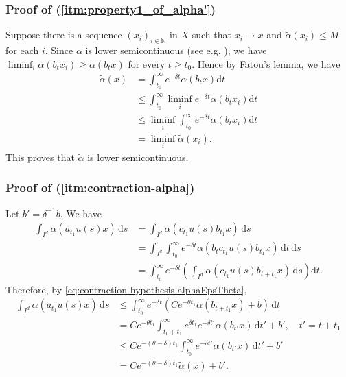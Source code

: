 \documentclass[12pt,reqno]{amsart}
\numberwithin{equation}{section}
\theoremstyle{plain}
\theoremstyle{definition}
\theoremstyle{remark}
\newcommand{\N}{\mathbb{N}}
\newcommand{\de}{\mathrm{d}}
\newcommand{\at}{\widetilde{\alpha}}
\begin{document}
	\subsubsection*{Proof of (\ref{itm:property1_of_alpha'})}
			Suppose there is a sequence $(x_i)_{i\in\N}$ in $X$ such that $x_i\to x$ and $\at (x_i)\leq M$ for each $i$. Since $\alpha$ is lower semicontinuous (see e.g. \cite[Lemma 4.1]{Shi20}), we have $\liminf_{i}\alpha(b_tx_i)\geq\alpha(b_tx)$ for every $t\geq t_0$. Hence by Fatou's lemma, we have
			\[
			\begin{split}
			\at (x)&=\int_{t_0}^{\infty}e^{-\delta t}\alpha(b_{t}x)\de t\\
			&\leq \int_{t_0}^\infty\liminf_i e^{-\delta t}\alpha(b_tx_i)\de t\\
			&\leq \liminf_i\int_{t_0}^\infty e^{-\delta t}\alpha(b_tx_i)\de t\\
			&=\liminf_i\at (x_i).
			\end{split}
			\]
			This proves that $\at $ is lower semicontinuous.


            \subsubsection*{Proof of (\ref{itm:contraction-alpha})}
			 Let $b'=\delta^{-1}b$. We have
			\begin{equation*}
			\begin{split}
			\int_{I^d}\at (a_{t_1}u(s)x)\,\de s &=\int_{I^d}\at(c_{t_1}u(s)b_{t_1}x)\,\de s \\
			&=\int_{I^d}\int_{t_0}^{\infty}e^{-\delta t}\alpha(b_{t}c_{t_1}u(s)b_{t_1}x)\,\de t\,\de s \\
			&=\int_{t_0}^{\infty}e^{-\delta t}\left(\int_{I^d}\alpha(c_{t_1}u(s)b_{t+t_1}x)\,\de s\right)\de t.
\end{split}
			\end{equation*}
            Therefore, by \eqref{eq:contraction hypothesis alphaEpsTheta}, 
            \begin{equation*}
			\begin{split}
            \int_{I^d}\at (a_{t_1}u(s)x)\,\de s 
            &\leq \int_{t_0}^{\infty}e^{-\delta t}(Ce^{-\theta t_1}\alpha(b_{t+t_1}x)+b)\,\de t\\
			&=Ce^{-\theta t_1}\int_{t_0+t_1}^\infty e^{\delta t_1}e^{-\delta t'}\alpha(b_{t'}x)\,
			\de t'+b',\quad t'=t+t_1\\
			&\leq Ce^{-(\theta-\delta)t_1}\int_{t_0}^\infty e^{-\delta t'}\alpha(b_{t'}x)\,\de t'+b'\\
			&=Ce^{-(\theta-\delta)t_1}\at (x)+b'.
			\end{split}
			\end{equation*}
			
\end{document}
